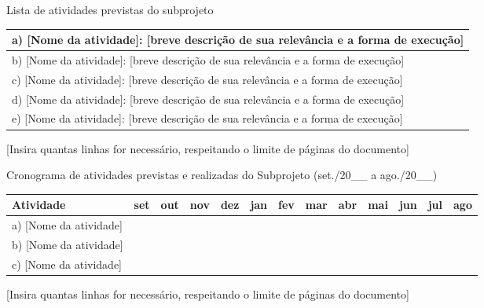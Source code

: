 \documentclass[12pt, a4paper]{article}
\begin{document}
\begin{quadro}[h]
	\caption{Lista de atividades previstas do subprojeto}
	\label{qdr-atividades}
	\begin{tabular}{|p{}|}
	\hline
	a) [Nome da atividade]: [breve descrição de sua relevância e a forma de execução] \\
	\hline
	b) [Nome da atividade]: [breve descrição de sua relevância e a forma de execução] \\
	\hline
	c) [Nome da atividade]: [breve descrição de sua relevância e a forma de execução] \\
	\hline
	d) [Nome da atividade]: [breve descrição de sua relevância e a forma de execução] \\
	\hline
	e) [Nome da atividade]: [breve descrição de sua relevância e a forma de execução] \\
	\hline
	\end{tabular}
	\caption*{[Insira quantas linhas for necessário, respeitando o limite de páginas do documento]}
\end{quadro}

\begin{quadro}[h]
	\centering
	\caption{Cronograma de atividades previstas e realizadas do Subprojeto (set./20\_\_ a ago./20\_\_)}
	\label{qdr-cronograma}
	\footnotesize
	\renewcommand{\arraystretch}{2}
	\setlength{\tabcolsep}{3pt}
	\begin{tabular}{| p{6.8cm} *{12}{| c} |}
		\hline
		\textbf{Atividade} & \textbf{set} & \textbf{out} & \textbf{nov} & \textbf{dez} & \textbf{jan} & \textbf{fev} & \textbf{mar} & \textbf{abr} & \textbf{mai} & \textbf{jun} & \textbf{jul} & \textbf{ago} \\
		\hline
		a) [Nome da atividade] &  &   &   &    &  &   &   &   &   &   &   &  \\
		\hline
		b) [Nome da atividade] &  &   &   &   &   &   &    &    &   &   &   &  \\
		\hline
		c) [Nome da atividade] &   &   &   &   &   &   &   &   &    &   &  & \\
		\hline
	\end{tabular}
	\vspace{5pt}
	\caption*{[Insira quantas linhas for necessário, respeitando o limite de páginas do documento]}
\end{quadro}


%



\end{document}
